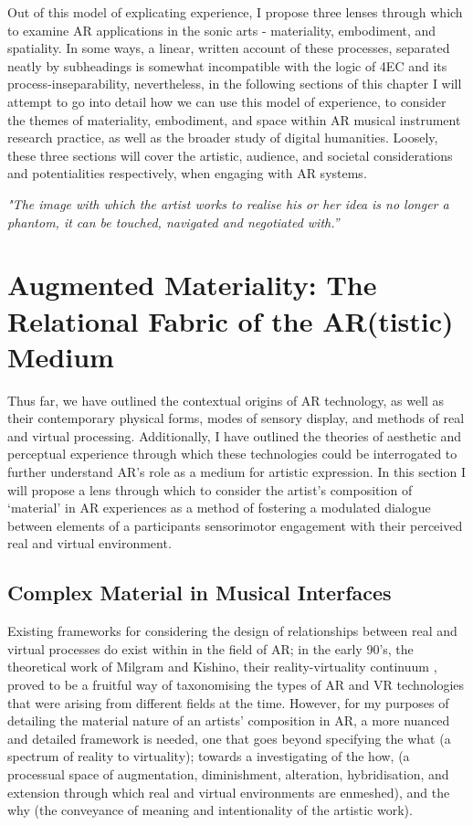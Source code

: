 Out of this model of explicating experience, I propose three lenses through which to examine AR applications in the sonic arts - materiality, embodiment, and spatiality. In some ways, a linear, written account of these processes, separated neatly by subheadings is somewhat incompatible with the logic of 4EC and its process-inseparability, nevertheless, in the following sections of this chapter I will attempt to go into detail how we can use this model of experience, to consider the themes of materiality, embodiment, and space within AR musical instrument research practice, as well as the broader study of digital humanities. Loosely, these three sections will cover the artistic, audience, and societal considerations and potentialities respectively, when engaging with AR systems.



\epigraph{\textit{"The image with which the artist works to realise his or her idea is no longer a phantom, it can be touched, navigated and negotiated with.”}}{\citep[p.5]{ryan1991}}

\section[Augmented Materiality]{Augmented Materiality: The Relational Fabric of the AR(tistic) Medium}
Thus far, we have outlined the contextual origins of AR technology, as well as their contemporary physical forms, modes of sensory display, and methods of real and virtual processing. Additionally, I have outlined the theories of aesthetic and perceptual experience through which these technologies could be interrogated to further understand AR’s role as a medium for artistic expression. In this section I will propose a lens through which to consider the artist’s composition of ‘material’ in AR experiences as a method of fostering a modulated dialogue between elements of a participants sensorimotor engagement with their perceived real and virtual environment. 

\subsection{Complex Material in Musical Interfaces}
Existing frameworks for considering the design of relationships between real and virtual processes do exist within in the field of AR; in the early 90’s, the theoretical work of Milgram and Kishino, their reality-virtuality continuum \citeyearpar[p. 10]{milgram1994}, proved to be a fruitful way of taxonomising the types of AR and VR technologies that were arising from different fields at the time. However, for my purposes of detailing the material nature of an artists’ composition in AR, a more nuanced and detailed framework is needed, one that goes beyond specifying the what (a spectrum of reality to virtuality); towards a investigating of the how, (a processual space of augmentation, diminishment, alteration, hybridisation, and extension through which real and virtual environments are enmeshed), and the why (the conveyance of meaning and intentionality of the artistic work). 

